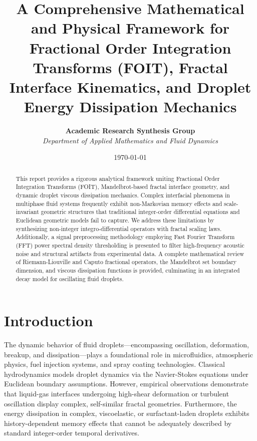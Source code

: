\documentclass[11pt,a4paper]{article}
\title{\Large \textbf{A Comprehensive Mathematical and Physical Framework for Fractional Order Integration Transforms (FOIT), Fractal Interface Kinematics, and Droplet Energy Dissipation Mechanics}}
\author{\textbf{Academic Research Synthesis Group} \\
\textit{Department of Applied Mathematics and Fluid Dynamics}}
\date{\today}
\begin{document}
\maketitle

\begin{abstract}
This report provides a rigorous analytical framework uniting Fractional Order Integration Transforms (FOIT), Mandelbrot-based fractal interface geometry, and dynamic droplet viscous dissipation mechanics. Complex interfacial phenomena in multiphase fluid systems frequently exhibit non-Markovian memory effects and scale-invariant geometric structures that traditional integer-order differential equations and Euclidean geometric models fail to capture. We address these limitations by synthesizing non-integer integro-differential operators with fractal scaling laws. Additionally, a signal preprocessing methodology employing Fast Fourier Transform (FFT) power spectral density thresholding is presented to filter high-frequency acoustic noise and structural artifacts from experimental data. A complete mathematical review of Riemann-Liouville and Caputo fractional operators, the Mandelbrot set boundary dimension, and viscous dissipation functions is provided, culminating in an integrated decay model for oscillating fluid droplets.
\end{abstract}

\section{Introduction}

The dynamic behavior of fluid droplets—encompassing oscillation, deformation, breakup, and dissipation—plays a foundational role in microfluidics, atmospheric physics, fuel injection systems, and spray coating technologies. Classical hydrodynamics models droplet dynamics via the Navier-Stokes equations under Euclidean boundary assumptions. However, empirical observations demonstrate that liquid-gas interfaces undergoing high-shear deformation or turbulent oscillation display complex, self-similar fractal geometries. Furthermore, the energy dissipation in complex, viscoelastic, or surfactant-laden droplets exhibits history-dependent memory effects that cannot be adequately described by standard integer-order temporal derivatives.
\end{document}
